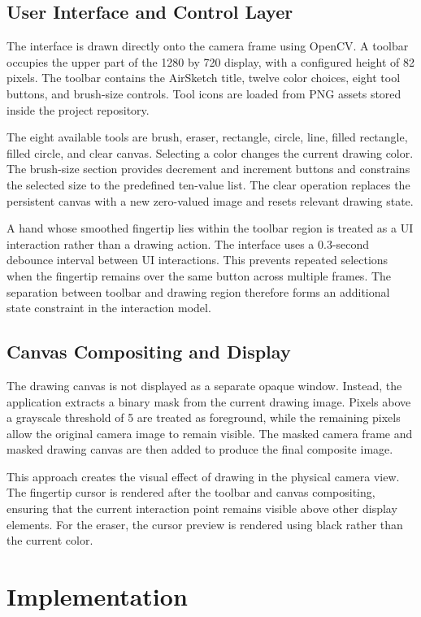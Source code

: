 \documentclass[conference]{IEEEtran}
\begin{document}
\subsection{User Interface and Control Layer}
The interface is drawn directly onto the camera frame using OpenCV. A toolbar occupies the upper part of the 1280 by 720 display, with a configured height of 82 pixels. The toolbar contains the AirSketch title, twelve color choices, eight tool buttons, and brush-size controls. Tool icons are loaded from PNG assets stored inside the project repository.

The eight available tools are brush, eraser, rectangle, circle, line, filled rectangle, filled circle, and clear canvas. Selecting a color changes the current drawing color. The brush-size section provides decrement and increment buttons and constrains the selected size to the predefined ten-value list. The clear operation replaces the persistent canvas with a new zero-valued image and resets relevant drawing state.

A hand whose smoothed fingertip lies within the toolbar region is treated as a UI interaction rather than a drawing action. The interface uses a 0.3-second debounce interval between UI interactions. This prevents repeated selections when the fingertip remains over the same button across multiple frames. The separation between toolbar and drawing region therefore forms an additional state constraint in the interaction model.

\subsection{Canvas Compositing and Display}
The drawing canvas is not displayed as a separate opaque window. Instead, the application extracts a binary mask from the current drawing image. Pixels above a grayscale threshold of 5 are treated as foreground, while the remaining pixels allow the original camera image to remain visible. The masked camera frame and masked drawing canvas are then added to produce the final composite image.

This approach creates the visual effect of drawing in the physical camera view. The fingertip cursor is rendered after the toolbar and canvas compositing, ensuring that the current interaction point remains visible above other display elements. For the eraser, the cursor preview is rendered using black rather than the current color.

\section{Implementation}
\end{document}
